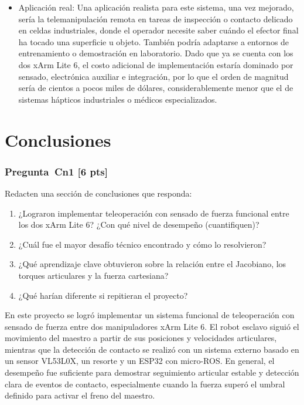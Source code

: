 \documentclass[journal,10pt,twoside]{IEEEtran}
\newcommand{\pts}[1]{\textbf{\color{tec_red}[#1 pts]}}
\begin{document}
\begin{itemize}
    \item Aplicación real: Una aplicación realista para este sistema, una vez mejorado, sería la telemanipulación remota en tareas de inspección o contacto delicado en celdas industriales, donde el operador necesite saber cuándo el efector final ha tocado una superficie u objeto. También podría adaptarse a entornos de entrenamiento o demostración en laboratorio. Dado que ya se cuenta con los dos xArm Lite 6, el costo adicional de implementación estaría dominado por sensado, electrónica auxiliar e integración, por lo que el orden de magnitud sería de cientos a pocos miles de dólares, considerablemente menor que el de sistemas hápticos industriales o médicos especializados.
\end{itemize}

\section{Conclusiones}
\label{sec:conclusions}

\subsubsection*{Pregunta~Cn1 \pts{6}}
Redacten una sección de conclusiones que responda:
\begin{enumerate}[label=(\alph*)]
  \item ¿Lograron implementar teleoperación con sensado de fuerza
        funcional entre los dos xArm Lite 6? ¿Con qué nivel de
        desempeño (cuantifiquen)?
  \item ¿Cuál fue el mayor desafío técnico encontrado y cómo lo resolvieron?
  \item ¿Qué aprendizaje clave obtuvieron sobre la relación entre
        el Jacobiano, los torques articulares y la fuerza cartesiana?
  \item ¿Qué harían diferente si repitieran el proyecto?
\end{enumerate}

En este proyecto se logró implementar un sistema funcional de teleoperación con sensado de fuerza entre dos manipuladores xArm Lite 6. El robot esclavo siguió el movimiento del maestro a partir de sus posiciones y velocidades articulares, mientras que la detección de contacto se realizó con un sistema externo basado en un sensor VL53L0X, un resorte y un ESP32 con micro-ROS. En general, el desempeño fue suficiente para demostrar seguimiento articular estable y detección clara de eventos de contacto, especialmente cuando la fuerza superó el umbral definido para activar el freno del maestro.
\\
\end{document}
